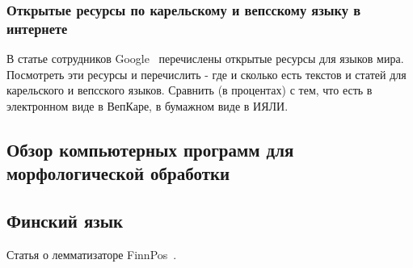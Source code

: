 \subsubsection{Открытые ресурсы по карельскому и вепсскому языку в интернете} \label{sect_open_krl_vep_inet}

В статье сотрудников Google~\cite{Prasad2018} перечислены открытые ресурсы для языков мира. 
Посмотреть эти ресурсы и перечислить - где и сколько есть текстов и статей 
для карельского и вепсского языков. Сравнить (в процентах) с тем, что есть 
в электронном виде в ВепКаре, в бумажном виде в ИЯЛИ.








\subsection{Обзор компьютерных программ для морфологической обработки}

\subsection{Финский язык}\label{sect_review_fin}

Статья о лемматизаторе FinnPos~\cite{silfverberg2016finnpos}.

